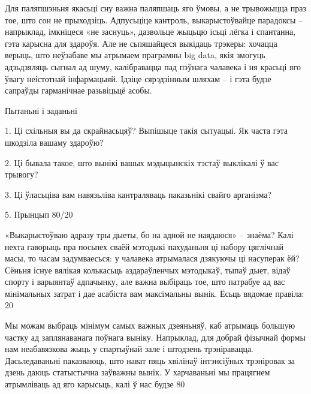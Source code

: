 Для паляпшэньня якасьці сну важна паляпшаць яго ўмовы, а не трывожыцца праз тое, што сон не прыходзіць. Адпусьціце кантроль, выкарыстоўвайце парадоксы – напрыклад, імкніцеся «не заснуць», дазвольце жыцьцю ісьці лёгка і спантанна, гэта карысна для здароўя. Але не сьпяшайцеся выкідаць трэкеры: хочацца верыць, што неўзабаве мы атрымаем праграмны big data, якія змогуць адзьдзяляць сыгнал ад шуму, калібравацца пад пэўнага чалавека і ня красьці яго ўвагу неістотнай інфармацыяй. Ідзіце сярэдзінным шляхам – і гэта будзе сапраўды гарманічнае разьвіцьцё асобы.

Пытаньні і заданьні

1. Ці схільныя вы да скрайнасьцяў? Выпішыце такія сытуацыі. Як часта гэта шкодзіла вашаму здароўю?

2. Ці бывала такое, што вынікі вашых мэдыцынскіх тэстаў выклікалі ў вас трывогу?

3. Ці ўласьціва вам навязьліва кантраляваць паказьнікі свайго арганізма?


5. Прынцып 80/20


«Выкарыстоўваю адразу тры дыеты, бо на адной не наядаюся» – знаёма? Калі нехта гаворыць пра посьпех сваёй мэтодыкі пахуданьня ці набору цяглічнай масы, то часам задумваесься: у чалавека атрымалася дзякуючы ці насуперак ёй? Сёньня існуе вялікая колькасьць аздараўленчых мэтодыкаў, тыпаў дыет, відаў спорту і варыянтаў адпачынку, але важна выбіраць тое, што патрабуе ад вас мінімальных затрат і дае асабіста вам максімальны вынік. Ёсьць вядомае правіла: 20%

Мы можам выбраць мінімум самых важных дзеяньняў, каб атрымаць большую частку ад заплянаванага поўнага выніку. Напрыклад, для добрай фізычнай формы нам неабавязкова жыць у спартыўнай зале і штодзень трэніравацца. Дасьледаваньні паказваюць, што нават пяць хвілінаў інтэнсіўных трэніровак за дзень даюць статыстычна заўважны вынік. У харчаваньні мы працягнем атрымліваць ад яго карысьць, калі ў нас будзе 80%


